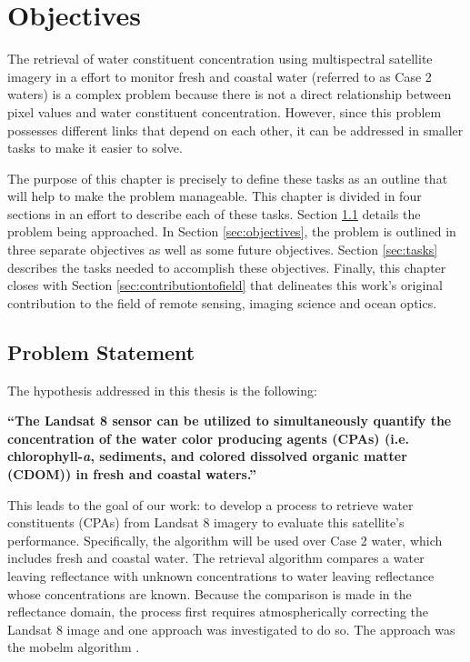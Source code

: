 \chapter{Objectives}
\label{ch:objectives}
\vspace{-0.5cm}

The retrieval of water constituent concentration using multispectral satellite imagery in a effort to monitor fresh and coastal water (referred to as Case 2 waters) is a complex problem because there is not a direct relationship between pixel values and water constituent concentration. However, since this problem possesses different links that depend on each other, it can be addressed in smaller tasks to make it easier to solve. 

The purpose of this chapter is precisely to define these tasks as an outline that will help to make the problem manageable. This chapter is divided in four sections in an effort to describe each of these tasks. Section \ref{sec:problemstatement} details the problem being approached. In Section \ref{sec:objectives}, the problem is outlined in three separate objectives as well as some future objectives. Section \ref{sec:tasks} describes the tasks needed to accomplish these objectives. Finally, this chapter closes with Section \ref{sec:contributiontofield} that delineates this work's original contribution to the field of remote sensing, imaging science and ocean optics. 
\section{Problem Statement}
\label{sec:problemstatement}
The hypothesis addressed in this thesis is the following: 

{ \bf ``The Landsat 8 sensor can be utilized to simultaneously quantify the concentration of the water color producing agents (CPAs) (i.e. chlorophyll-{\it a}, sediments, and colored dissolved organic matter (CDOM)) in fresh and coastal waters.''} 

This leads to the goal of our work: to develop a process to retrieve water constituents (CPAs) from Landsat 8 imagery to evaluate this satellite's performance. Specifically, the algorithm will be used over Case 2 water, which includes fresh and coastal water. The retrieval algorithm compares a water leaving reflectance with unknown concentrations to water leaving reflectance whose concentrations are known. Because the comparison is made in the reflectance domain, the process first requires atmospherically correcting the Landsat 8 image and one approach was investigated to do so. The approach was the \acrfull{mobelm} algorithm \citep{Concha2014SPIE}.

